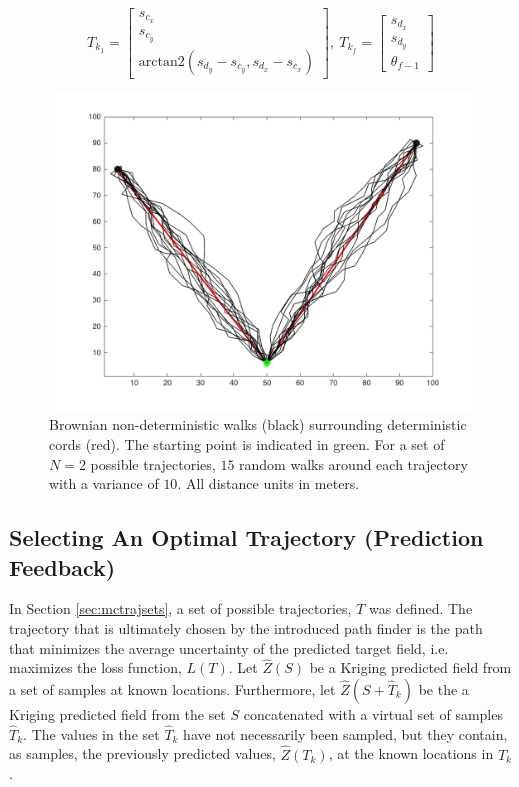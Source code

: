 \begin{equation}
	T_{k_1} = \begin{bmatrix}
		s_{c_x} \\
		s_{c_y} \\
		\text{arctan2}(s_{d_y} - s_{c_y}, s_{d_x} - s_{c_x})
	\end{bmatrix},\ 
	T_{k_f} = \begin{bmatrix}
		s_{d_x} \\
		s_{d_y} \\
		\theta_{f-1}
	\end{bmatrix}
\end{equation}

\begin{figure}[h!]
	\centering
	\includegraphics[width=0.8\linewidth]{figures/brownian_motion_mc.png}
	\ssp
	\caption{Brownian non-deterministic walks (black) surrounding deterministic cords (red). The starting point is indicated in green. For a set of $N=2$ possible trajectories, $15$ random walks around each trajectory with a variance of $10$. All distance units in meters.}
\end{figure}

\subsection{Selecting An Optimal Trajectory (Prediction Feedback)} \label{sec:mcselbesttraj}
In Section \ref{sec:mctrajsets}, a set of possible trajectories, $T$ was defined. The trajectory that is ultimately chosen by the introduced path finder is the path that minimizes the average uncertainty of the predicted target field, i.e. maximizes the loss function, $L(T)$.
Let $\hat{Z}(S)$ be a Kriging predicted field from a set of samples at known locations. Furthermore, let $\hat{Z}(S+\hat{T}_k)$ be the a Kriging predicted field from the set $S$ concatenated with a virtual set of samples $\hat{T}_k$. The values in the set $\hat{T}_k$ have not necessarily been sampled, but they contain, as samples, the previously predicted values, $\hat{Z}(T_k)$, at the known locations in $T_k$.

